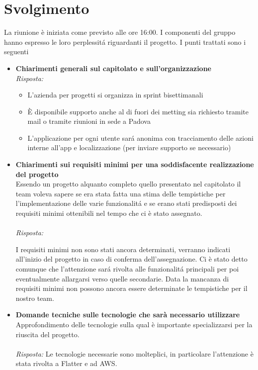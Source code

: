 \documentclass[a4paper,12pt]{article}
\begin{document}
\section{Svolgimento}
    La riunione è iniziata come previsto alle ore 16:00. I componenti del gruppo hanno espresso le loro perplessitá riguardanti il progetto. I punti trattati sono i seguenti
    \begin{itemize}
    \item \textbf{Chiarimenti generali sul capitolato e sull'organizzazione}\\
    \noindent
    \textit{Risposta:} \\
    \begin{itemize}
        \item L'azienda per progetti si organizza in sprint bisettimanali
        \item È disponibile supporto anche al di fuori dei metting sia richiesto tramite mail o tramite riunioni in sede a Padova
        \item L'applicazione per ogni utente sará anonima con tracciamento delle azioni interne all'app e localizzazione (per inviare supporto se necessario)
    \end{itemize}
    
    \vspace{1em}

    \item \textbf{Chiarimenti sui requisiti minimi per una soddisfacente realizzazione del progetto}\\
    \noindent
    Essendo un progetto alquanto completo quello presentato nel capitolato il team voleva sapere se era stata fatta una stima delle tempistiche per l'implementazione delle varie funzionalitá e se erano stati predisposti dei requisiti minimi ottenibili nel tempo che ci è stato assegnato.\\ \\
    \textit{Risposta:} 
    
    I requisiti minimi non sono stati ancora determinati, verranno indicati all'inizio del progetto in caso di conferma dell'assegnazione. Ci è stato detto comunque che l'attenzione sará rivolta alle funzionalitá principali per poi eventualmente allargarsi verso quelle secondarie. Data la mancanza di requisiti minimi non possono ancora essere determinate le tempistiche per il nostro team.
    \vspace{1em}

    \item \textbf{Domande tecniche sulle tecnologie che sarà necessario utilizzare}\\
    \noindent
    Approfondimento delle tecnologie sulla qual è importante specializzarsi per la riuscita del progetto.\\ \\
    \textit{Risposta:} 
    Le tecnologie necessarie sono molteplici, in particolare l'attenzione è stata rivolta a Flatter e ad AWS.
    \vspace{1em}


\end{itemize}
\end{document}
